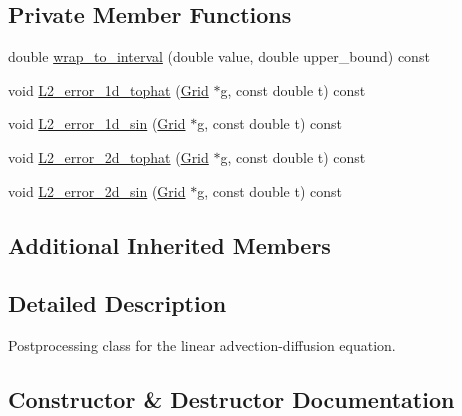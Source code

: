 \subsection*{Private Member Functions}
\begin{DoxyCompactItemize}
\item 
double \hyperlink{class_postprocess___advection_a7b416da80a8ce796736910b5b3f66df4}{wrap\+\_\+to\+\_\+interval} (double value, double upper\+\_\+bound) const 
\item 
void \hyperlink{class_postprocess___advection_a261d6487e494a237784ed3b3f1597ea9}{L2\+\_\+error\+\_\+1d\+\_\+tophat} (\hyperlink{class_grid}{Grid} $\ast$g, const double t) const 
\item 
void \hyperlink{class_postprocess___advection_a2eea0ec04826ead7194cbdfc67c65adc}{L2\+\_\+error\+\_\+1d\+\_\+sin} (\hyperlink{class_grid}{Grid} $\ast$g, const double t) const 
\item 
void \hyperlink{class_postprocess___advection_abd25bc55c609922bd49cd699056290b2}{L2\+\_\+error\+\_\+2d\+\_\+tophat} (\hyperlink{class_grid}{Grid} $\ast$g, const double t) const 
\item 
void \hyperlink{class_postprocess___advection_aa5971a4fb00e3a3e8a90191280782617}{L2\+\_\+error\+\_\+2d\+\_\+sin} (\hyperlink{class_grid}{Grid} $\ast$g, const double t) const 
\end{DoxyCompactItemize}
\subsection*{Additional Inherited Members}


\subsection{Detailed Description}
Postprocessing class for the linear advection-\/diffusion equation. 

\subsection{Constructor \& Destructor Documentation}
